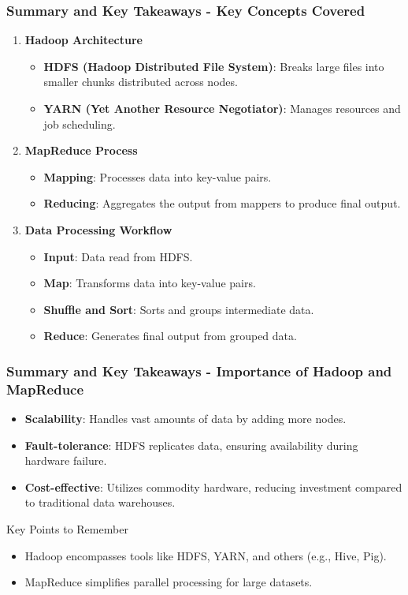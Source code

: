 \documentclass[aspectratio=169]{beamer}
\begin{document}
\begin{frame}[fragile]
    \frametitle{Summary and Key Takeaways - Key Concepts Covered}
    \begin{enumerate}
        \item \textbf{Hadoop Architecture}
        \begin{itemize}
            \item \textbf{HDFS (Hadoop Distributed File System)}: Breaks large files into smaller chunks distributed across nodes.
            \item \textbf{YARN (Yet Another Resource Negotiator)}: Manages resources and job scheduling.
        \end{itemize}
        
        \item \textbf{MapReduce Process}
        \begin{itemize}
            \item \textbf{Mapping}: Processes data into key-value pairs.
            \item \textbf{Reducing}: Aggregates the output from mappers to produce final output.
        \end{itemize}
        
        \item \textbf{Data Processing Workflow}
        \begin{itemize}
            \item \textbf{Input}: Data read from HDFS.
            \item \textbf{Map}: Transforms data into key-value pairs.
            \item \textbf{Shuffle and Sort}: Sorts and groups intermediate data.
            \item \textbf{Reduce}: Generates final output from grouped data.
        \end{itemize}
    \end{enumerate}
\end{frame}

\begin{frame}[fragile]
    \frametitle{Summary and Key Takeaways - Importance of Hadoop and MapReduce}
    \begin{itemize}
        \item \textbf{Scalability}: Handles vast amounts of data by adding more nodes.
        \item \textbf{Fault-tolerance}: HDFS replicates data, ensuring availability during hardware failure.
        \item \textbf{Cost-effective}: Utilizes commodity hardware, reducing investment compared to traditional data warehouses.
    \end{itemize}
    \begin{block}{Key Points to Remember}
        \begin{itemize}
            \item Hadoop encompasses tools like HDFS, YARN, and others (e.g., Hive, Pig).
            \item MapReduce simplifies parallel processing for large datasets.
        \end{itemize}
    \end{block}
\end{frame}
\end{document}
